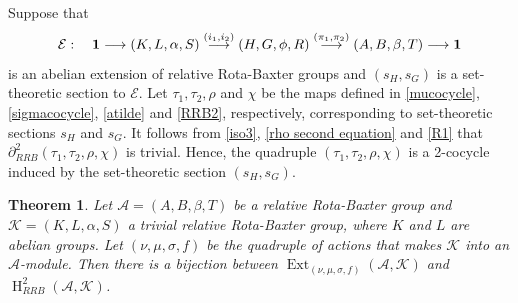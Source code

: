 \documentclass[11pt]{amsart}
\theoremstyle{thrm}
\theoremstyle{plain}
\newtheorem{thm}{Theorem}[section]
\theoremstyle{definition}
\newcommand{\Ho}{\operatorname{H} }
\newcommand{\Ext}{\operatorname{Ext} }
\numberwithin{equation}{section}
\begin{document}
Suppose that  
$$\mathcal{E} : \quad {\bf 1} \longrightarrow (K,L, \alpha,S ) \stackrel{(i_1, i_2)}{\longrightarrow}  (H,G, \phi, R) \stackrel{(\pi_1, \pi_2)}{\longrightarrow} (A,B, \beta, T) \longrightarrow {\bf 1}$$
is an abelian extension of relative Rota-Baxter groups and $(s_H, s_G)$ is a  set-theoretic section to $\mathcal{E}$. Let  $\tau_1, \tau_2, \rho$ and $\chi$ be the maps defined in  \eqref{mucocycle}, \eqref{sigmacocycle}, \eqref{atilde} and \eqref{RRB2}, respectively, corresponding to set-theoretic sections $s_H$ and $s_G$. It follows from \eqref{iso3}, \eqref{rho second equation} and \eqref{R1} that $\partial_{RRB}^2(\tau_1, \tau_2, \rho, \chi)$ is trivial. Hence, the quadruple $(\tau_1, \tau_2, \rho, \chi)$ is a 2-cocycle induced by the set-theoretic section $(s_H, s_G)$.

\begin{thm}\label{ext and cohom bijection}
Let $\mathcal{A}= (A,B, \beta, T)$ be a relative Rota-Baxter group and $\mathcal{K}=  (K,L,\alpha,S )$ a trivial relative Rota-Baxter group, where $K$ and $L$ are abelian groups.  Let  $(\nu, \mu, \sigma, f)$ be the quadruple of actions that makes $\mathcal{K}$ into an $\mathcal{A}$-module. Then there is a bijection between $\Ext_{(\nu, \mu, \sigma, f)}(\mathcal{A}, \mathcal{K})$ and $\Ho^2_{RRB}(\mathcal{A}, \mathcal{K})$.  
\end{thm}
\end{document}
